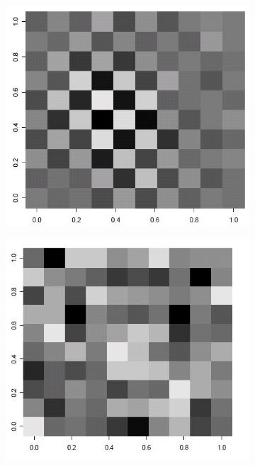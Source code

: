 \documentclass[12pt]{beamer}
\begin{document}
\begin{frame}
\begin{figure}
\begin{subfigure}[b]{0.26\linewidth}
    \caption{}
  \end{subfigure}
  \begin{subfigure}[b]{0.24\linewidth}
    \includegraphics[width=\linewidth]{Neg_SpatCorr.jpg}
     \caption{}
  \end{subfigure}
  \begin{subfigure}[b]{0.24\linewidth}
    \includegraphics[width=\linewidth]{Null_SpatCorr.jpg}
     \caption{}
  \end{subfigure}
\end{figure}




\end{frame}
\end{document}
